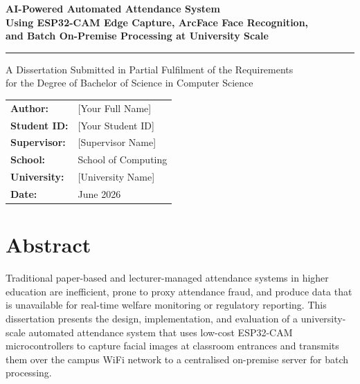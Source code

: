 \documentclass[12pt,a4paper]{report}
\begin{document}

\begin{titlepage}
  \centering
  \vspace*{2cm}

  {\huge\bfseries AI-Powered Automated Attendance System\\[0.5em]
  \large Using ESP32-CAM Edge Capture, ArcFace Face Recognition,\\
  and Batch On-Premise Processing at University Scale\par}

  \vspace{1.5cm}
  \rule{\linewidth}{0.5pt}
  \vspace{0.5cm}

  {\large A Dissertation Submitted in Partial Fulfilment of the Requirements\\
  for the Degree of Bachelor of Science in Computer Science\par}

  \vspace{2cm}

  \begin{tabular}{ll}
    \textbf{Author:}      & [Your Full Name] \\[0.3em]
    \textbf{Student ID:}  & [Your Student ID] \\[0.3em]
    \textbf{Supervisor:}  & [Supervisor Name] \\[0.3em]
    \textbf{School:}      & School of Computing \\[0.3em]
    \textbf{University:}  & [University Name] \\[0.3em]
    \textbf{Date:}        & June 2026 \\
  \end{tabular}

  \vfill
\end{titlepage}

\chapter*{Abstract}
Traditional paper-based and lecturer-managed attendance systems in higher education are inefficient, prone to proxy attendance fraud, and produce data that is unavailable for real-time welfare monitoring or regulatory reporting. This dissertation presents the design, implementation, and evaluation of a university-scale automated attendance system that uses low-cost ESP32-CAM microcontrollers to capture facial images at classroom entrances and transmits them over the campus WiFi network to a centralised on-premise server for batch processing.
\end{document}
